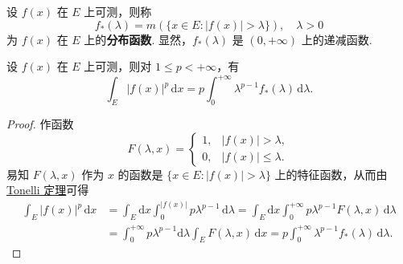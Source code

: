 \documentclass[../../main.tex]{subfiles}
\begin{document}
\begin{definition}[分布函数]
设 \( f(x) \) 在 \( E \) 上可测，则称
\[
f_*(\lambda) = m(\{ x \in E : |f(x)| > \lambda \}), \quad \lambda > 0
\]
为 \( f(x) \) 在 \( E \) 上的\textbf{分布函数}. 显然，\( f_*(\lambda) \) 是 \( (0, +\infty) \) 上的递减函数.
\end{definition}

\begin{theorem}
设 \( f(x) \) 在 \( E \) 上可测，则对 \( 1 \leqslant  p < +\infty \)，有
\[
\int_E |f(x)|^p \, \mathrm{d}x = p \int_0^{+\infty} \lambda^{p - 1} f_*(\lambda) \, \mathrm{d}\lambda. \tag{4.17}
\]
\end{theorem}
\begin{proof}
作函数
\[
F(\lambda, x) = 
\begin{cases} 
1, & |f(x)| > \lambda, \\
0, & |f(x)| \leqslant  \lambda.
\end{cases}
\]
易知 \( F(\lambda, x) \) 作为 \( x \) 的函数是 \( \{ x \in E : |f(x)| > \lambda \} \) 上的特征函数，从而由 \hyperref[theorem:Tonelli 定理 非负可测函数的情形]{Tonelli 定理}可得
\begin{align*}
\int_E |f(x)|^p \, \mathrm{d}x &= \int_E \mathrm{d}x \int_0^{|f(x)|} p\lambda^{p - 1} \, \mathrm{d}\lambda = \int_E \mathrm{d}x \int_0^{+\infty} p\lambda^{p - 1} F(\lambda, x) \, \mathrm{d}\lambda \\
&= \int_0^{+\infty} p\lambda^{p - 1} \mathrm{d}\lambda \int_E F(\lambda, x) \, \mathrm{d}x = p \int_0^{+\infty} \lambda^{p - 1} f_*(\lambda) \, \mathrm{d}\lambda.
\end{align*}
\end{proof}
\end{document}
